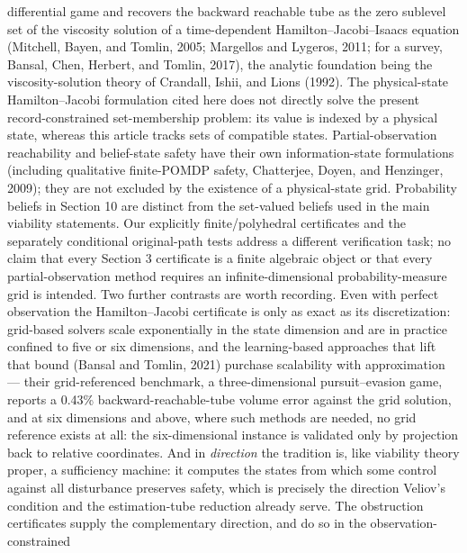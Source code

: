 \documentclass[10pt,twocolumn]{article}
\theoremstyle{definition}
\begin{document}
differential game and recovers the backward reachable tube as the zero sublevel set of the
viscosity solution of a time-dependent Hamilton--Jacobi--Isaacs equation (Mitchell, Bayen,
and Tomlin, 2005; Margellos and Lygeros, 2011; for a survey, Bansal, Chen, Herbert, and
Tomlin, 2017), the analytic foundation being the viscosity-solution theory of Crandall, Ishii,
and Lions (1992).  The physical-state Hamilton--Jacobi formulation cited here does not directly solve the present record-constrained set-membership problem: its value is indexed by a physical state, whereas this article tracks sets of compatible states. Partial-observation reachability and belief-state safety have their own information-state formulations (including qualitative finite-POMDP safety, Chatterjee, Doyen, and Henzinger, 2009); they are not excluded by the existence of a physical-state grid. Probability beliefs in Section 10 are distinct from the set-valued beliefs used in the main viability statements. Our explicitly finite/polyhedral certificates and the separately conditional original-path tests address a different verification task; no claim that every Section 3 certificate is a finite algebraic object or that every partial-observation method requires an infinite-dimensional probability-measure grid is intended. Two further contrasts are worth
recording.  Even with perfect observation the Hamilton--Jacobi certificate is only as exact
as its discretization: grid-based solvers scale exponentially in the state dimension and are
in practice confined to five or six dimensions, and the learning-based approaches that lift
that bound (Bansal and Tomlin, 2021) purchase scalability with approximation --- their
grid-referenced benchmark, a three-dimensional pursuit--evasion game, reports a 0.43\%
backward-reachable-tube volume error against the grid solution, and at six dimensions and
above, where such methods are needed, no grid reference exists at all: the six-dimensional
instance is validated only by projection back to relative coordinates.  And in \emph{direction} the tradition
is, like viability theory proper, a sufficiency machine: it computes the states from which
some control against all disturbance preserves safety, which is precisely the direction
Veliov's condition and the estimation-tube reduction already serve.  The obstruction
certificates supply the complementary direction, and do so in the observation-constrained
\end{document}
